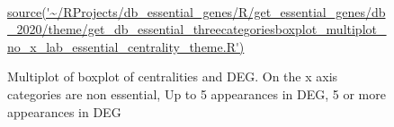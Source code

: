 ﻿%
﻿
﻿\begin{figure}[p]
    \vspace*{-2cm}
    \caption{Multiplot of boxplot of centralities and DEG. On the x axis categories are non essential, Up to 5 appearances in DEG, 5 or more appearances in DEG }
    \tiny\url{ source('~/RProjects/db_essential_genes/R/get_essential_genes/db_2020/theme/get_db_essential_threecategoriesboxplot_multiplot_no_x_lab_essential_centrality_theme.R')}
\end{figure}
﻿
﻿%
